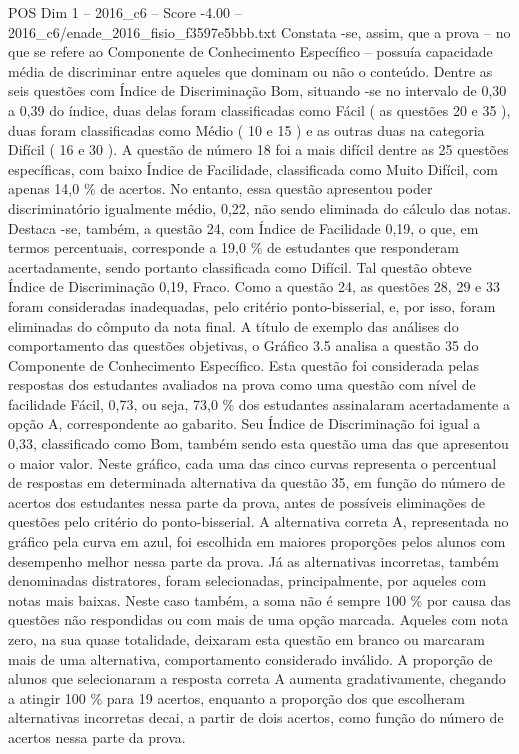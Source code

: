 \begin{textsample}{POS Dim 1 – 2016\_c6 – Score -4.00 – 2016\_c6/enade\_2016\_fisio\_f3597e5bbb.txt}
Constata -se, assim, que a prova – no que se refere ao Componente de Conhecimento Específico – possuía capacidade média de discriminar entre aqueles que dominam ou não o conteúdo.
Dentre as seis questões com Índice de Discriminação Bom, situando -se no intervalo de 0,30 a 0,39 do índice, duas delas foram classificadas como Fácil ( as questões 20 e 35 ), duas foram classificadas como Médio ( 10 e 15 ) e as outras duas na categoria Difícil ( 16 e 30 ).
A questão de número 18 foi a mais difícil dentre as 25 questões específicas, com baixo Índice de Facilidade, classificada como Muito Difícil, com apenas 14,0 \% de acertos.
No entanto, essa questão apresentou poder discriminatório igualmente médio, 0,22, não sendo eliminada do cálculo das notas.
Destaca -se, também, a questão 24, com Índice de Facilidade 0,19, o que, em termos percentuais, corresponde a 19,0 \% de estudantes que responderam acertadamente, sendo portanto classificada como Difícil.
Tal questão obteve Índice de Discriminação 0,19, Fraco.
Como a questão 24, as questões 28, 29 e 33 foram consideradas inadequadas, pelo critério ponto-bisserial, e, por isso, foram eliminadas do cômputo da nota final.
A título de exemplo das análises do comportamento das questões objetivas, o Gráfico 3.5 analisa a questão 35 do Componente de Conhecimento Específico.
Esta questão foi considerada pelas respostas dos estudantes avaliados na prova como uma questão com nível de facilidade Fácil, 0,73, ou seja, 73,0 \% dos estudantes assinalaram acertadamente a opção A, correspondente ao gabarito.
Seu Índice de Discriminação foi igual a 0,33, classificado como Bom, também sendo esta questão uma das que apresentou o maior valor.
Neste gráfico, cada uma das cinco curvas representa o percentual de respostas em determinada alternativa da questão 35, em função do número de acertos dos estudantes nessa parte da prova, antes de possíveis eliminações de questões pelo critério do ponto-bisserial.
A alternativa correta A, representada no gráfico pela curva em azul, foi escolhida em maiores proporções pelos alunos com desempenho melhor nessa parte da prova.
Já as alternativas incorretas, também denominadas distratores, foram selecionadas, principalmente, por aqueles com notas mais baixas.
Neste caso também, a soma não é sempre 100 \% por causa das questões não respondidas ou com mais de uma opção marcada.
Aqueles com nota zero, na sua quase totalidade, deixaram esta questão em branco ou marcaram mais de uma alternativa, comportamento considerado inválido.
A proporção de alunos que selecionaram a resposta correta A aumenta gradativamente, chegando a atingir 100 \% para 19 acertos, enquanto a proporção dos que escolheram alternativas incorretas decai, a partir de dois acertos, como função do número de acertos nessa parte da prova.

\end{textsample}
